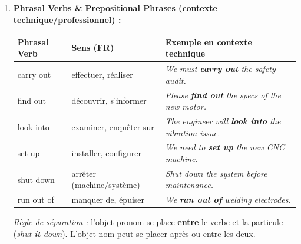 \documentclass[11pt]{article}
\newcommand{\cle}[1]{{\popxbold\color{popdark}#1}}
\begin{document}
\begin{methode}
\begin{enumerate}
\begin{itemize}
        \item Intonation : montante = vraie question (incertitude) ; descendante = confirmation attendue.
    \end{itemize}
    \item \textbf{Phrasal Verbs \& Prepositional Phrases (contexte technique/professionnel) :}
    \begin{center}
    \begin{tabularx}{\linewidth}{|l|X|X|}\hline
    \rowcolor{popblueL}\textbf{Phrasal Verb} & \textbf{Sens (FR)} & \textbf{Exemple en contexte technique} \\ \hline
    \cle{carry out} & effectuer, réaliser & \emph{We must \textbf{carry out} the safety audit.} \\ \hline
    \cle{find out} & découvrir, s'informer & \emph{Please \textbf{find out} the specs of the new motor.} \\ \hline
    \cle{look into} & examiner, enquêter sur & \emph{The engineer will \textbf{look into} the vibration issue.} \\ \hline
    \cle{set up} & installer, configurer & \emph{We need to \textbf{set up} the new CNC machine.} \\ \hline
    \cle{shut down} & arrêter (machine/système) & \emph{Shut down the system before maintenance.} \\ \hline
    \cle{run out of} & manquer de, épuiser & \emph{We \textbf{ran out of} welding electrodes.} \\ \hline
    \end{tabularx}
    \end{center}
    \emph{Règle de séparation :} l'objet pronom se place \textbf{entre} le verbe et la particule (\emph{shut \textbf{it} down}). L'objet nom peut se placer après ou entre les deux.
\end{enumerate}
\end{methode}
\end{document}
